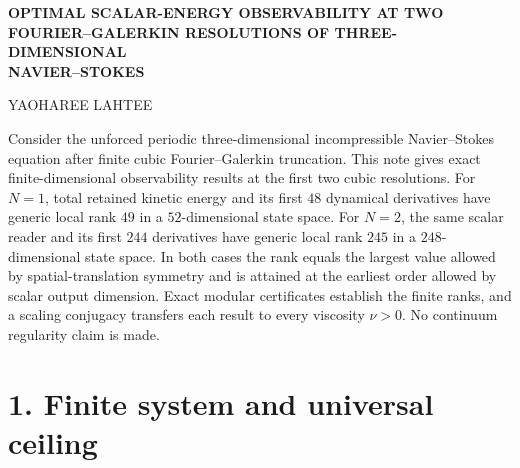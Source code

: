 \documentclass[10pt,leqno,twoside]{article}
\theoremstyle{plain}
\theoremstyle{remark}
\begin{document}
\thispagestyle{plain}

\vspace*{-0.18in}
\begin{center}
{\bfseries\large OPTIMAL SCALAR-ENERGY OBSERVABILITY AT TWO\\[2pt]
FOURIER--GALERKIN RESOLUTIONS OF THREE-DIMENSIONAL\\[2pt]
NAVIER--STOKES}

\vspace{0.27in}
{\small YAOHAREE LAHTEE}
\end{center}

\vspace{0.18in}

Consider the unforced periodic three-dimensional incompressible Navier--Stokes equation after
finite cubic Fourier--Galerkin truncation.  This note gives exact finite-dimensional
observability results at the first two cubic resolutions.  For $N=1$, total retained kinetic
energy and its first $48$ dynamical derivatives have generic local rank $49$ in a
$52$-dimensional state space.  For $N=2$, the same scalar reader and its first $244$
derivatives have generic local rank $245$ in a $248$-dimensional state space.  In both cases
the rank equals the largest value allowed by spatial-translation symmetry and is attained at
the earliest order allowed by scalar output dimension.  Exact modular certificates establish
the finite ranks, and a scaling conjugacy transfers each result to every viscosity $\nu>0$.
No continuum regularity claim is made.

\section*{1. Finite system and universal ceiling}
\end{document}

